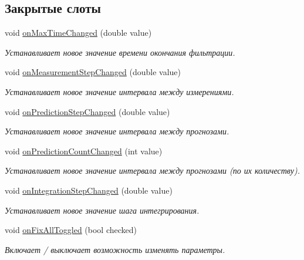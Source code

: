 \subsection*{Закрытые слоты}
\begin{DoxyCompactItemize}
\item 
void \hyperlink{class_filter_parameters_widget_a80199438a8dededc61f17d7acd0e2487}{on\+Max\+Time\+Changed} (double value)
\begin{DoxyCompactList}\small\item\em Устанавливает новое значение времени окончания фильтрации. \end{DoxyCompactList}\item 
void \hyperlink{class_filter_parameters_widget_afdabd842b69fd6a4b65b4d44a5c81c55}{on\+Measurement\+Step\+Changed} (double value)
\begin{DoxyCompactList}\small\item\em Устанавливает новое значение интервала между измерениями. \end{DoxyCompactList}\item 
void \hyperlink{class_filter_parameters_widget_aa78cbb97c3a70babc20c35cf0e6f346a}{on\+Prediction\+Step\+Changed} (double value)
\begin{DoxyCompactList}\small\item\em Устанавливает новое значение интервала между прогнозами. \end{DoxyCompactList}\item 
void \hyperlink{class_filter_parameters_widget_a4c0b14d9be53fd4b45179037e09c33b3}{on\+Prediction\+Count\+Changed} (int value)
\begin{DoxyCompactList}\small\item\em Устанавливает новое значение интервала между прогнозами (по их количеству). \end{DoxyCompactList}\item 
void \hyperlink{class_filter_parameters_widget_a8461deaa884f5615241d6730b73f9d7b}{on\+Integration\+Step\+Changed} (double value)
\begin{DoxyCompactList}\small\item\em Устанавливает новое значение шага интегрирования. \end{DoxyCompactList}\item 
void \hyperlink{class_filter_parameters_widget_a6d01e0b6bdb2b38f03a6935fac62a31c}{on\+Fix\+All\+Toggled} (bool checked)
\begin{DoxyCompactList}\small\item\em Включает / выключает возможность изменять параметры. \end{DoxyCompactList}\item 

\end{DoxyCompactItemize}

